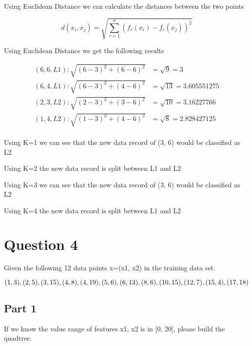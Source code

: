 \documentclass{report}
\begin{document}
Using Euclidean Distance we can calculate the distances between the two points

\begin{equation*}
  d(x_i, x_j) = \sqrt{\sum_{r=1}^{n}(f_r(x_i)-f_r(x_j))^2} 
\end{equation*}

Using Euclidean Distance we get the following results

\begin{equation*}
  \begin{split}
    (6, 6, L1): \sqrt{(6-3)^2 + (6-6)^2} & = \sqrt{9} = 3 \\
    (6, 4, L1): \sqrt{(6-3)^2 + (4-6)^2} & = \sqrt{13} = 3.605551275 \\
    (2, 3, L2): \sqrt{(2-3)^2 + (3-6)^2} & = \sqrt{10} = 3.16227766 \\
    (1, 4, L2): \sqrt{(1-3)^2 + (4-6)^2} & = \sqrt{8} = 2.828427125 \\
  \end{split}
\end{equation*}

Using K=1 we can see that the new data record of (3, 6) would be classified as L2

Using K=2 the new data record is split between L1 and L2

Using K=3 we can see that the new data record of (3, 6) would be classified as L2

Using K=4 the new data record is split between L1 and L2

\chapter{Question 4}

Given the following 12  data  points x=(x1, x2) in  the training  data  set.

\begin{equation*}
  (1, 3), (2, 5), (3, 15),  (4, 8), (4, 19),  (5, 6), (6, 13), \\
  (8, 6), (10,  15),  (12,  7), (15,  4), (17,  18)
\end{equation*}

\section{Part 1}
If  we  know  the value range of  features  x1, x2  is  in  [0, 20],  please  build the 
quadtree. 
\end{document}
